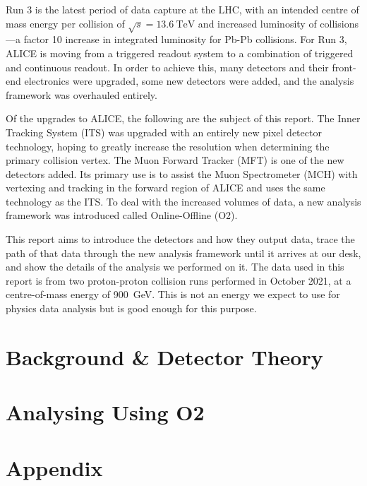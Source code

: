 \documentclass[11pt]{article}
\numberwithin{equation}{section}
\numberwithin{figure}{section}
\numberwithin{table}{section}
\begin{document}
Run 3 is the latest period of data capture at the LHC, with an intended centre of mass energy per collision of $\sqrt{s}=\SI{13.6}{\tera\electronvolt}$ and increased luminosity of collisions---a factor 10 increase in integrated luminosity for Pb-Pb collisions. For Run 3, ALICE is moving from a triggered readout system to a combination of triggered and continuous readout. In order to achieve this, many detectors and their front-end electronics were upgraded, some new detectors were added, and the analysis framework was overhauled entirely. 

Of the upgrades to ALICE, the following are the subject of this report. The Inner Tracking System (ITS) was upgraded with an entirely new pixel detector technology, hoping to greatly increase the resolution when determining the primary collision vertex. The Muon Forward Tracker (MFT) is one of the new detectors added. Its primary use is to assist the Muon Spectrometer (MCH) with vertexing and tracking in the forward region of ALICE and uses the same technology as the ITS. To deal with the increased volumes of data, a new analysis framework was introduced called Online-Offline (O2). 

This report aims to introduce the detectors and how they output data, trace the path of that data through the new analysis framework until it arrives at our desk, and show the details of the analysis we performed on it. The data used in this report is from two proton-proton collision runs performed in October 2021, at a centre-of-mass energy of \SI{900}{\giga\electronvolt}. This is not an energy we expect to use for physics data analysis but is good enough for this purpose.

\section{Background \& Detector Theory}\label{sec:Background_Detector}


\section{Analysing Using O2}\label{sec:AnalysingWithO2}



\newpage
\printbibliography

\newpage
\section*{Appendix}
\appendix

\end{document}
